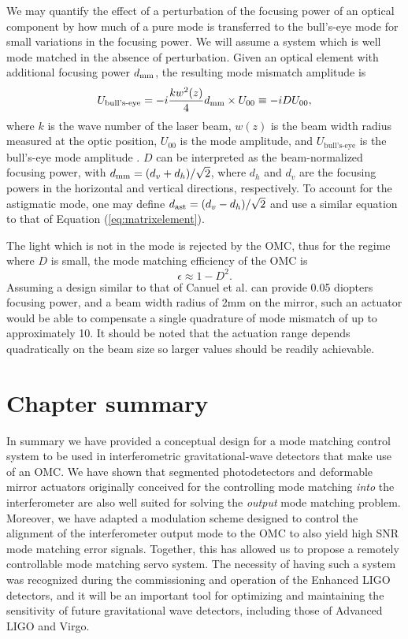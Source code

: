 We may quantify the effect of a perturbation of the focusing power of an optical component by how much of a pure  mode is transferred to the bull's-eye mode for small variations in the focusing power. %
We will assume a system which is well mode matched in the absence of perturbation. %
Given an optical element with additional focusing power $d_{\rm mm}$, the resulting mode mismatch amplitude is
\begin{equation}
\label{eq:matrixelement}
U_{\text{bull's-eye}} = -i\frac{k w^2(z)}{4} d_{\rm mm} \times U_{00}\equiv -iDU_{00},
\end{equation}
where $k$ is the wave number of the laser beam, $w(z)$ is the beam width radius measured at the optic position, $U_{00}$ is the  mode amplitude, and $U_{\text{bull's-eye}}$ is the bull's-eye mode amplitude \cite{ModalModelUpdate4}. %
$D$ can be interpreted as the beam-normalized focusing power, with $d_{\rm mm} = (d_v+d_h)/\sqrt{2}$, where $d_h$  and $d_v$ are the focusing powers in the horizontal and vertical directions, respectively. %
To account for the astigmatic mode, one may define $d_{\rm ast}=(d_v-d_h)/\sqrt{2}$ and use a similar equation to that of Equation (\ref{eq:matrixelement}).

The light which is not in the  mode is rejected by the OMC, thus for the regime where $D$ is small, the mode matching efficiency of the OMC is
\begin{equation}
\epsilon \approx 1 - D^2.
\end{equation}
Assuming a design similar to that of Canuel et al. %
can provide 0.05 diopters focusing power, and a beam width radius of 2mm on the mirror, such an actuator would be able to compensate a single quadrature of mode mismatch of up to approximately 10\perc{}. %
It should be noted that the actuation range depends quadratically on the beam size so larger values should be readily achievable.

\section{Chapter summary}
In summary we have provided a conceptual design for a mode matching control system to be used in interferometric gravitational-wave detectors that make use of an OMC. %
We have shown that segmented photodetectors and deformable mirror actuators originally conceived for the controlling mode matching {\it into} the interferometer are also well suited for solving the {\it output }mode matching problem. %
Moreover, we have adapted a modulation scheme designed to control the alignment of the interferometer output mode to the OMC to also yield high SNR mode matching error signals. %
Together, this has allowed us to propose a remotely controllable mode matching servo system. %
The necessity of having such a system was recognized during the commissioning and operation of the Enhanced LIGO detectors, and it will be an important tool for optimizing and maintaining the sensitivity of future gravitational wave detectors, including those of Advanced LIGO and Virgo.
